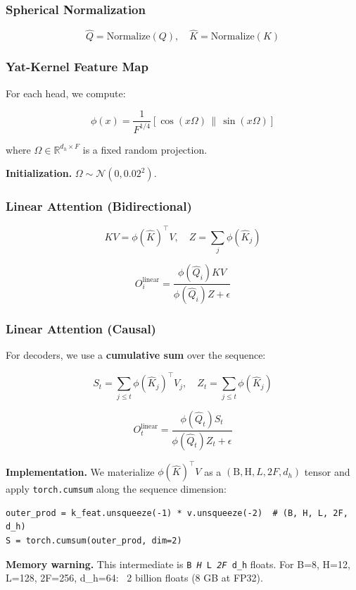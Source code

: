 \subsubsection{Spherical Normalization}

\[
\hat{Q} = \text{Normalize}(Q), \quad
\hat{K} = \text{Normalize}(K)
\]

\subsubsection{Yat-Kernel Feature Map}

For each head, we compute:

\[
\phi(x) = \frac{1}{F^{1/4}} \left[ \cos(x \Omega) \,\|\, \sin(x \Omega) \right]
\]

where $\Omega \in \mathbb{R}^{d_h \times F}$ is a fixed random projection.

\textbf{Initialization.} $\Omega \sim \mathcal{N}(0, 0.02^2)$.

\subsubsection{Linear Attention (Bidirectional)}

\[
KV = \phi(\hat{K})^\top V, \quad
Z = \sum_j \phi(\hat{K}_j)
\]

\[
O^\text{linear}_i = \frac{\phi(\hat{Q}_i) KV}{\phi(\hat{Q}_i) Z + \epsilon}
\]

\subsubsection{Linear Attention (Causal)}

For decoders, we use a \textbf{cumulative sum} over the sequence:

\[
S_t = \sum_{j \leq t} \phi(\hat{K}_j)^\top V_j, \quad
Z_t = \sum_{j \leq t} \phi(\hat{K}_j)
\]

\[
O^\text{linear}_t = \frac{\phi(\hat{Q}_t) S_t}{\phi(\hat{Q}_t) Z_t + \epsilon}
\]

\textbf{Implementation.} We materialize $\phi(\hat{K})^\top V$ as a 
$(\text{B}, \text{H}, L, 2F, d_h)$ tensor and apply \texttt{torch.cumsum} along 
the sequence dimension:

\begin{lstlisting}
outer_prod = k_feat.unsqueeze(-1) * v.unsqueeze(-2)  # (B, H, L, 2F, d_h)
S = torch.cumsum(outer_prod, dim=2)
\end{lstlisting}

\textbf{Memory warning.} This intermediate is \texttt{B \textit{ H } L \textit{ 2F } d\_h} floats. 
For B=8, H=12, L=128, 2F=256, d\_h=64: ~2 billion floats (8 GB at FP32).

